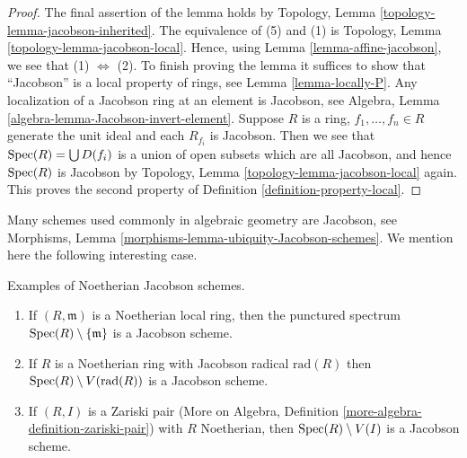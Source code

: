 \begin{proof}
The final assertion of the lemma holds by
Topology, Lemma \ref{topology-lemma-jacobson-inherited}.
The equivalence of (5) and (1) is
Topology, Lemma \ref{topology-lemma-jacobson-local}.
Hence, using Lemma \ref{lemma-affine-jacobson},
we see that (1) $\Leftrightarrow$ (2).
To finish proving the lemma it suffices to show that ``Jacobson''
is a local property of rings, see Lemma \ref{lemma-locally-P}.
Any localization of a Jacobson ring at an element is Jacobson, see
Algebra, Lemma \ref{algebra-lemma-Jacobson-invert-element}.
Suppose $R$ is a ring, $f_1, \ldots, f_n \in R$ generate the unit
ideal and each $R_{f_i}$ is Jacobson. Then we see that
$\mathop{\mathrm{Spec}}(R) = \bigcup D(f_i)$ is a union of open subsets
which are all Jacobson, and hence $\mathop{\mathrm{Spec}}(R)$ is Jacobson
by Topology, Lemma \ref{topology-lemma-jacobson-local} again.
This proves the second property of Definition \ref{definition-property-local}.
\end{proof}

\noindent
Many schemes used commonly in algebraic geometry are Jacobson, see
Morphisms, Lemma \ref{morphisms-lemma-ubiquity-Jacobson-schemes}.
We mention here the following interesting case.

\begin{lemma}
\label{lemma-complement-closed-point-Jacobson}
Examples of Noetherian Jacobson schemes.
\begin{enumerate}
\item If $(R, \mathfrak m)$ is a Noetherian local ring, then
the punctured spectrum $\mathop{\mathrm{Spec}}(R) \setminus \{\mathfrak m\}$
is a Jacobson scheme.
\item If $R$ is a Noetherian ring with Jacobson radical $\text{rad}(R)$
then $\mathop{\mathrm{Spec}}(R) \setminus V(\text{rad}(R))$ is a Jacobson scheme.
\item If $(R, I)$ is a Zariski pair (More on Algebra, Definition
\ref{more-algebra-definition-zariski-pair})
with $R$ Noetherian, then $\mathop{\mathrm{Spec}}(R) \setminus V(I)$ is a
Jacobson scheme.
\end{enumerate}
\end{lemma}

